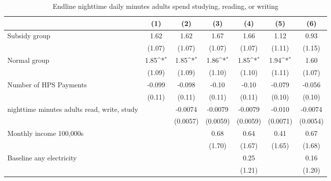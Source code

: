 \begin{table}[htbp]\centering
\def\sym#1{\ifmmode^{#1}\else\(^{#1}\)\fi}
\caption{Endline nighttime daily minutes adults spend studying, reading, or writing}
\begin{tabular*}{1\hsize}{@{\hskip\tabcolsep\extracolsep\fill}l*{6}{c}}
\toprule
                &\multicolumn{1}{c}{(1)}         &\multicolumn{1}{c}{(2)}         &\multicolumn{1}{c}{(3)}         &\multicolumn{1}{c}{(4)}         &\multicolumn{1}{c}{(5)}         &\multicolumn{1}{c}{(6)}         \\
\midrule
Subsidy group   &     1.62         &     1.62         &     1.67         &     1.66         &     1.12         &     0.93         \\
                &   (1.07)         &   (1.07)         &   (1.07)         &   (1.07)         &   (1.11)         &   (1.15)         \\
Normal group    &     1.85\sym{*}  &     1.85\sym{*}  &     1.86\sym{*}  &     1.85\sym{*}  &     1.94\sym{*}  &     1.60         \\
                &   (1.09)         &   (1.09)         &   (1.10)         &   (1.10)         &   (1.11)         &   (1.07)         \\
Number of HPS Payments&   -0.099         &   -0.098         &    -0.10         &    -0.10         &   -0.079         &   -0.056         \\
                &   (0.11)         &   (0.11)         &   (0.11)         &   (0.11)         &   (0.10)         &   (0.10)         \\
nighttime minutes adults read, write, study&                  &  -0.0074         &  -0.0079         &  -0.0079         &   -0.010         &  -0.0074         \\
                &                  & (0.0057)         & (0.0059)         & (0.0059)         & (0.0071)         & (0.0054)         \\
Monthly income 100,000s&                  &                  &     0.68         &     0.64         &     0.41         &     0.67         \\
                &                  &                  &   (1.70)         &   (1.67)         &   (1.65)         &   (1.68)         \\
Baseline any electricity&                  &                  &                  &     0.25         &                  &     0.16         \\
                &                  &                  &                  &   (1.21)         &                  &   (1.20)         \\

\end{tabular*}
\end{table}
